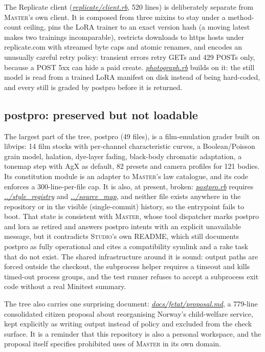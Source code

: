 \documentclass[oneside]{article}
\newcommand{\treename}[1]{\mbox{\textsc{#1}}}
\newcommand{\mtree}{\treename{Master}}
\newcommand{\stree}{\treename{Studio}}
\newcommand{\fpath}[1]{\emph{\url{#1}}}
\begin{document}
The Replicate client (\fpath{replicate/client.rb}, 520 lines) is deliberately separate from \mtree's own client. It is composed from three mixins to stay under a method-count ceiling, pins the LoRA trainer to an exact version hash (a moving latest makes two trainings incomparable), restricts downloads to https hosts under replicate.com with streamed byte caps and atomic renames, and encodes an unusually careful retry policy: transient errors retry GETs and 429 POSTs only, because a POST 5xx can hide a paid create. \fpath{photograph.rb} builds on it: the still model is read from a trained LoRA manifest on disk instead of being hard-coded, and every still is graded by postpro before it is returned.

\subsection{postpro: preserved but not loadable}

The largest part of the tree, postpro (49 files), is a film-emulation grader built on libvips: 14 film stocks with per-channel characteristic curves, a Boolean/Poisson grain model, halation, dye-layer fading, black-body chromatic adaptation, a tonemap step with AgX as default, 82 presets and camera profiles for 121 bodies. Its constitution module is an adapter to \mtree's law catalogue, and its code enforces a 300-line-per-file cap. It is also, at present, broken: \fpath{postpro.rb} requires \fpath{../style_registry} and \fpath{../source_map}, and neither file exists anywhere in the repository or in the visible (single-commit) history, so the entrypoint fails to boot. That state is consistent with \mtree, whose tool dispatcher marks postpro and lora as retired and answers postpro intents with an explicit unavailable message, but it contradicts \stree's own README, which still documents postpro as fully operational and cites a compatibility symlink and a rake task that do not exist. The shared infrastructure around it is sound: output paths are forced outside the checkout, the subprocess helper requires a timeout and kills timed-out process groups, and the test runner refuses to accept a subprocess exit code without a real Minitest summary.

The tree also carries one surprising document: \fpath{docs/fetat/proposal.md}, a 779-line consolidated citizen proposal about reorganising Norway's child-welfare service, kept explicitly as writing output instead of policy and excluded from the check surface. It is a reminder that this repository is also a personal workspace, and the proposal itself specifies prohibited uses of \mtree{} in its own domain.
\end{document}
